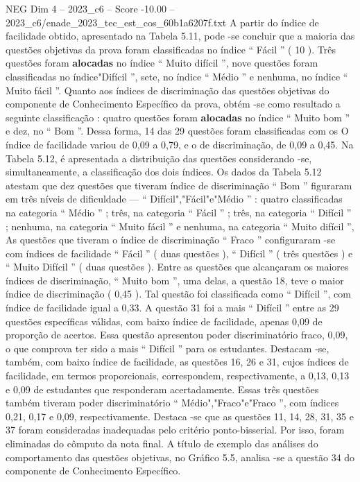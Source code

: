 \begin{textsample}{NEG Dim 4 – 2023\_c6 – Score -10.00 – 2023\_c6/enade\_2023\_tec\_est\_cos\_60b1a6207f.txt}
A partir do índice de facilidade obtido, apresentado na Tabela 5.11, pode -se concluir que a maioria das questões objetivas da prova foram classificadas no índice “ Fácil ” ( 10 ).
Três questões foram \textbf{alocadas} no índice “ Muito difícil ”, nove questões foram classificadas no índice"Difícil ”, sete, no índice “ Médio ” e nenhuma, no índice “ Muito fácil ”.
Quanto aos índices de discriminação das questões objetivas do componente de Conhecimento Específico da prova, obtém -se como resultado a seguinte classificação : quatro questões foram \textbf{alocadas} no índice “ Muito bom ” e dez, no “ Bom ”.
Dessa forma, 14 das 29 questões foram classificadas com os O índice de facilidade variou de 0,09 a 0,79, e o de discriminação, de 0,09 a 0,45.
Na Tabela 5.12, é apresentada a distribuição das questões considerando -se, simultaneamente, a classificação dos dois índices.
Os dados da Tabela 5.12 atestam que dez questões que tiveram índice de discriminação “ Bom ” figuraram em três níveis de dificuldade — “ Difícil","Fácil"e"Médio ” : quatro classificadas na categoria “ Médio ” ; três, na categoria “ Fácil ” ; três, na categoria “ Difícil ” ; nenhuma, na categoria “ Muito fácil ” e nenhuma, na categoria “ Muito difícil ”, As questões que tiveram o índice de discriminação “ Fraco ” configuraram -se com índices de facilidade “ Fácil ” ( duas questões ), “ Difícil ” ( três questões ) e “ Muito Difícil ” ( duas questões ).
Entre as questões que alcançaram os maiores índices de discriminação, “ Muito bom ”, uma delas, a questão 18, teve o maior índice de discriminação ( 0,45 ).
Tal questão foi classificada como “ Difícil ”, com índice de facilidade igual a 0,33.
A questão 31 foi a mais “ Difícil ” entre as 29 questões específicas válidas, com baixo índice de facilidade, apenas 0,09 de proporção de acertos.
Essa questão apresentou poder discriminatório fraco, 0,09, o que comprova ter sido a mais “ Difícil ” para os estudantes.
Destacam -se, também, com baixo índice de facilidade, as questões 16, 26 e 31, cujos índices de facilidade, em termos proporcionais, correspondem, respectivamente, a 0,13, 0,13 e 0,09 de estudantes que responderam acertadamente.
Essas três questões também tiveram poder discriminatório “ Médio","Fraco"e"Fraco ”, com índices 0,21, 0,17 e 0,09, respectivamente.
Destaca -se que as questões 11, 14, 28, 31, 35 e 37 foram consideradas inadequadas pelo critério ponto-bisserial.
Por isso, foram eliminadas do cômputo da nota final.
A título de exemplo das análises do comportamento das questões objetivas, no Gráfico 5.5, analisa -se a questão 34 do componente de Conhecimento Específico.

\end{textsample}
